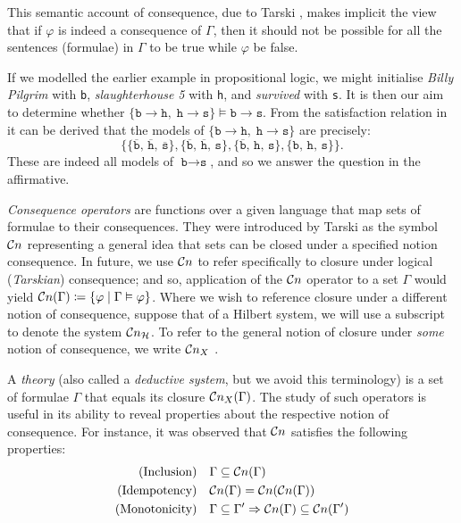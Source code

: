 This semantic account of consequence, due to Tarski , makes implicit the view that if
$\varphi$ is indeed a consequence of $\Gamma$, then it should not be possible for all the sentences (formulae) in $\Gamma$
to be true while $\varphi$ be false.

\begin{example}
	\label{example-logical-consequence} If we modelled the earlier example in propositional logic, we might initialise
	\textit{Billy Pilgrim} with \texttt{b}, \textit{slaughterhouse 5} with \texttt{h}, and \textit{survived} with \texttt{s}.
	It is then our aim to determine whether $\{\texttt{b}\rightarrow \texttt{h},\; \texttt{h}\rightarrow \texttt{s}\} \vDash
	\texttt{b}\rightarrow \texttt{s}$. From the satisfaction relation in  it can be derived
	that the models of $\{\texttt{b}\rightarrow \texttt{h},\; \texttt{h}\rightarrow \texttt{s}\}$ are precisely:
	\[
		\bigl\{ \{\overline{\texttt{b}},\,\overline{\texttt{h}},\,\overline{\texttt{s}}\}, \{\overline{\texttt{b}},\,\overline
		{\texttt{h}},\,{\texttt{s}}\}, \{\overline{\texttt{b}},\,{\texttt{h}},\,{\texttt{s}}\} , \{{\texttt{b}},\,{\texttt{h}}
		,\,{\texttt{s}}\} \bigr\}.
	\]
	These are indeed all models of $\texttt{b}\rightarrow \texttt{s}$, and so we answer the question in the affirmative.
\end{example}

\textit{Consequence operators} are functions over a given language that map sets of formulae to their consequences. They
were introduced by Tarski  as the symbol $\mathcal{C}n$ representing a general idea that sets can
be closed under a specified notion consequence. In future, we use $\mathcal{C}n$ to refer specifically to closure under logical
(\textit{Tarskian}) consequence; and so, application of the $\mathcal{C}n$ operator to a set $\Gamma$ would yield
$\mathcal{C}n (\Gamma) \coloneqq \{\varphi \mid \Gamma \vDash \varphi\}$. Where we wish to reference closure under a different notion
of consequence, suppose that of a Hilbert system, we will use a subscript to denote the system $\mathcal{C}n_{\mathcal{H}}$. To
refer to the general notion of closure under \textit{some} notion of consequence, we write $\mathcal{C}n_{X}$
\cite[p. 4]{citkin2022consequence}.

A \textit{theory} (also called a \textit{deductive system}, but we avoid this terminology) is a set of formulae $\Gamma$
that equals its closure $\mathcal{C}n_{X}(\Gamma)$. The study of such operators is useful in its ability to reveal properties
about the respective notion of consequence. For instance, it was observed \cite{tarski1936operator} that $\mathcal{C}n$
satisfies the following properties:
%
\begin{align}
	\text{(Inclusion)}    & \quad \Gamma \subseteq \mathcal{C}n (\Gamma)                                               \\
	\text{(Idempotency)}  & \quad \mathcal{C}n (\Gamma) = \mathcal{C}n (\mathcal{C}n (\Gamma))                                       \\
	\text{(Monotonicity)} & \quad \Gamma \subseteq \Gamma' \Rightarrow \mathcal{C}n (\Gamma) \subseteq \mathcal{C}n (\Gamma')
\end{align}

